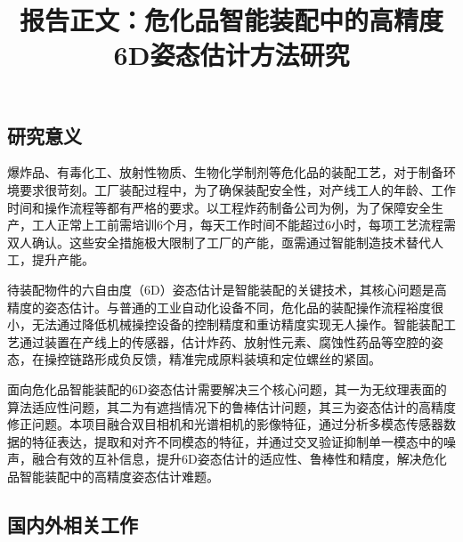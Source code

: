 \documentclass[12pt]{article}
\begin{document}

\title{报告正文：危化品智能装配中的高精度6D姿态估计方法研究}

\maketitle




\subsection{研究意义}

爆炸品、有毒化工、放射性物质、生物化学制剂等危化品的装配工艺，对于制备环境要求很苛刻。工厂装配过程中，为了确保装配安全性，对产线工人的年龄、工作时间和操作流程等都有严格的要求。以工程炸药制备公司为例，为了保障安全生产，工人正常上工前需培训6个月，每天工作时间不能超过6小时，每项工艺流程需双人确认。这些安全措施极大限制了工厂的产能，亟需通过智能制造技术替代人工，提升产能。

待装配物件的六自由度（6D）姿态估计是智能装配的关键技术，其核心问题是高精度的姿态估计。与普通的工业自动化设备不同，危化品的装配操作流程裕度很小，无法通过降低机械操控设备的控制精度和重访精度实现无人操作。智能装配工艺通过装置在产线上的传感器，估计炸药、放射性元素、腐蚀性药品等空腔的姿态，在操控链路形成负反馈，精准完成原料装填和定位螺丝的紧固。

面向危化品智能装配的6D姿态估计需要解决三个核心问题，其一为无纹理表面的算法适应性问题，其二为有遮挡情况下的鲁棒估计问题，其三为姿态估计的高精度修正问题。本项目融合双目相机和光谱相机的影像特征，通过分析多模态传感器数据的特征表达，提取和对齐不同模态的特征，并通过交叉验证抑制单一模态中的噪声，融合有效的互补信息，提升6D姿态估计的适应性、鲁棒性和精度，解决危化品智能装配中的高精度姿态估计难题。

\subsection{国内外相关工作}
\end{document}
